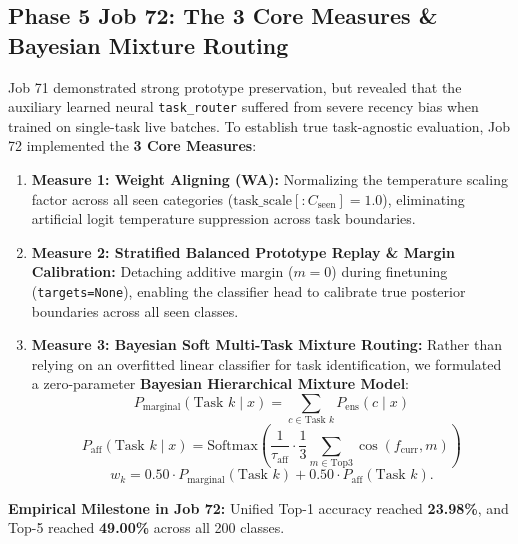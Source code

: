\documentclass[11pt,a4paper]{article}
\begin{document}
    \subsection{Phase 5 Job 72: The 3 Core Measures \& Bayesian Mixture Routing}
    Job 71 demonstrated strong prototype preservation, but revealed that the auxiliary learned neural \texttt{task\_router} suffered from severe recency bias when trained on single-task live batches. To establish true task-agnostic evaluation, Job 72 implemented the \textbf{3 Core Measures}:
    \begin{enumerate}[leftmargin=*]
        \item \textbf{Measure 1: Weight Aligning (WA):} Normalizing the temperature scaling factor across all seen categories ($\text{task\_scale}[:C_{\text{seen}}] = 1.0$), eliminating artificial logit temperature suppression across task boundaries.
        \item \textbf{Measure 2: Stratified Balanced Prototype Replay \& Margin Calibration:} Detaching additive margin ($m=0$) during finetuning (\texttt{targets=None}), enabling the classifier head to calibrate true posterior boundaries across all seen classes.
        \item \textbf{Measure 3: Bayesian Soft Multi-Task Mixture Routing:} Rather than relying on an overfitted linear classifier for task identification, we formulated a zero-parameter \textbf{Bayesian Hierarchical Mixture Model}:
        \begin{equation}
            P_{\text{marginal}}(\text{Task } k \mid x) = \sum_{c \in \text{Task } k} P_{\text{ens}}(c \mid x)
        \end{equation}
        \begin{equation}
            P_{\text{aff}}(\text{Task } k \mid x) = \text{Softmax}\left( \frac{1}{\tau_{\text{aff}}} \cdot \frac{1}{3} \sum_{m \in \text{Top3}} \cos(f_{\text{curr}}, m) \right)
        \end{equation}
        \begin{equation}
            w_k = 0.50 \cdot P_{\text{marginal}}(\text{Task } k) + 0.50 \cdot P_{\text{aff}}(\text{Task } k).
        \end{equation}
    \end{enumerate}
    \textbf{Empirical Milestone in Job 72:} Unified Top-1 accuracy reached \textbf{23.98\%}, and Top-5 reached \textbf{49.00\%} across all 200 classes.
\end{document}
